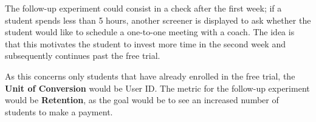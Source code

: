 \documentclass[11pt]{article} %
\begin{document}
The follow-up experiment could consist in a check after the first week; if a student spends less than 5 hours, another screener is displayed to ask whether the student would like to schedule a one-to-one meeting with a coach. The idea is that this motivates the student to invest more time in the second week and subsequently continues past the free trial.\medskip

As this concerns only students that have already enrolled in the free trial, the \textbf{Unit of Conversion} would be User ID. The metric for the follow-up experiment would be \textbf{Retention}, as the goal would be to see an increased number of students to make a payment.
\end{document}
